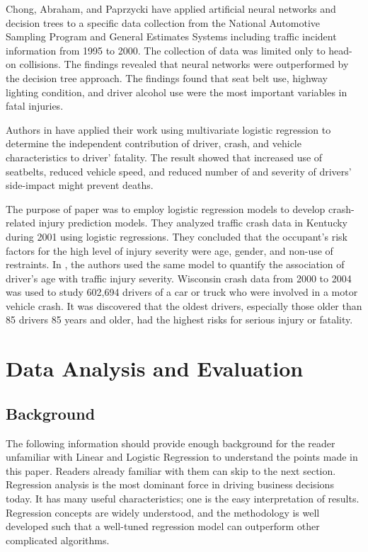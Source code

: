 \documentclass[conference]{IEEEtran}
\begin{document}
Chong, Abraham, and Paprzycki \cite{chong2004traffic} have applied artificial neural networks and decision trees to a specific data collection from the National Automotive Sampling Program and General Estimates Systems including traffic incident information from 1995 to 2000. The collection of data was limited only to head-on collisions. The findings revealed that neural networks were outperformed by the decision tree approach. The findings found that seat belt use, highway lighting condition, and driver alcohol use were the most important variables in fatal injuries.

Authors in \cite{Bedard} have applied their work using multivariate logistic regression to determine the independent contribution of driver, crash, and vehicle characteristics to driver' fatality. The result showed that increased use of seatbelts, reduced vehicle speed, and reduced number of and severity of drivers' side-impact might prevent deaths.

The purpose of paper \cite{SingletonFactors} was to employ logistic regression models to develop crash-related injury prediction models. They analyzed traffic crash data in Kentucky during 2001 using logistic regressions. They concluded that the occupant’s risk factors for the high level of injury severity were age, gender, and non-use of restraints. In \cite{ associationHanrahan}, the authors used the same model to quantify the association of driver’s age with traffic injury severity. Wisconsin crash data from 2000 to 2004 was used to study 602,694 drivers of a car or truck who were involved in a motor vehicle crash. It was discovered that the oldest drivers, especially those older than 85 drivers 85 years and older, had the highest risks for serious injury or fatality.


\section{Data Analysis and Evaluation}
\subsection{Background}
The following information should provide enough background for the reader unfamiliar with Linear and Logistic Regression to understand the points made in this paper. Readers already familiar with them can skip to the next section. Regression analysis is the most dominant force in driving business decisions today. It has many useful characteristics; one is the easy interpretation of results. Regression concepts are widely understood, and the methodology is well developed such that a well-tuned regression model can outperform other complicated algorithms.
\end{document}
